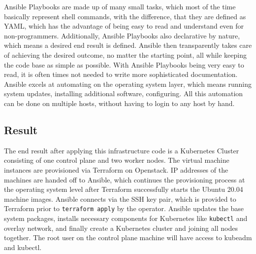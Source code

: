 \noindent
Ansible Playbooks are made up of many small tasks, which most of the time basically
represent shell commands, with the difference, that they are defined as YAML,
which has the advantage of being easy to read and understand even for non-programmers.
Additionally, Ansible Playbooks also declarative by nature, which means a desired end result 
is defined. Ansible then transparently takes care of achieving the desired outcome,
no matter the starting point, all while keeping the code base as simple as possible.
With Ansible Playbooks being very easy to read, it is often times not needed to write 
more sophisticated documentation.
Ansible excels at automating on the operating system layer,
which means running system updates, installing additional software,
configuring. All this automation can be done on multiple hosts, without 
having to login to any host by hand. 

\subsection{Result}
The end result after applying this infrastructure code is a 
Kubernetes Cluster consisting of one control plane and two worker nodes.
The virtual machine instances are provisioned via
Terraform on Openstack. IP addresses of the machines are handed off to Ansible, which continues
the provisioning process at the operating system level
after Terraform successfully starts the Ubuntu 20.04 machine images.
Ansible connects via the SSH key pair, which is provided to 
Terraform prior to \verb|terraform apply| by the operator.
Ansible updates the base system packages, installs necessary
components for Kubernetes like \verb|kubectl| and overlay network,
and finally create a Kubernetes cluster and joining all nodes together.
The root user on the control plane machine will have access to
kubeadm and kubectl.




